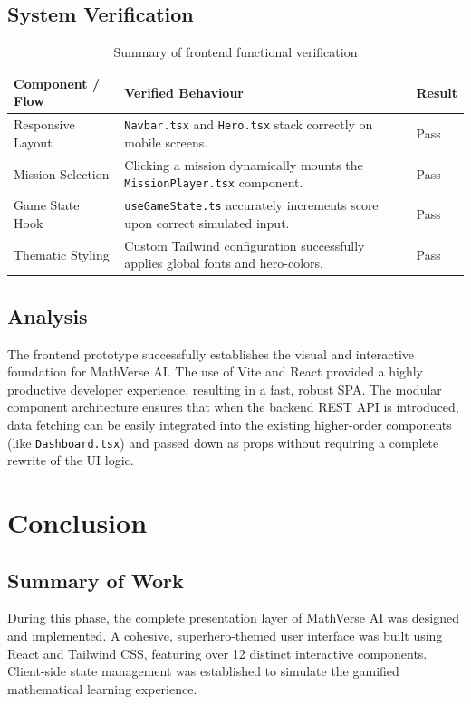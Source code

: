 \documentclass[12pt,a4paper]{report}
\begin{document}
\section{System Verification}

\begin{table}[h]
\centering
\begin{tabular}{@{}p{3.5cm}p{8.5cm}l@{}}
\toprule
\textbf{Component / Flow} & \textbf{Verified Behaviour} & \textbf{Result} \\ \midrule
Responsive Layout & \texttt{Navbar.tsx} and \texttt{Hero.tsx} stack correctly on mobile screens. & Pass \\ 
Mission Selection & Clicking a mission dynamically mounts the \texttt{MissionPlayer.tsx} component. & Pass \\ 
Game State Hook & \texttt{useGameState.ts} accurately increments score upon correct simulated input. & Pass \\ 
Thematic Styling & Custom Tailwind configuration successfully applies global fonts and hero-colors. & Pass \\ \bottomrule
\end{tabular}
\caption{Summary of frontend functional verification}
\end{table}

\section{Analysis}
The frontend prototype successfully establishes the visual and interactive foundation for MathVerse AI. The use of Vite and React provided a highly productive developer experience, resulting in a fast, robust SPA. The modular component architecture ensures that when the backend REST API is introduced, data fetching can be easily integrated into the existing higher-order components (like \texttt{Dashboard.tsx}) and passed down as props without requiring a complete rewrite of the UI logic.

\chapter{Conclusion}

\section{Summary of Work}
During this phase, the complete presentation layer of MathVerse AI was designed and implemented. A cohesive, superhero-themed user interface was built using React and Tailwind CSS, featuring over 12 distinct interactive components. Client-side state management was established to simulate the gamified mathematical learning experience.
\end{document}
